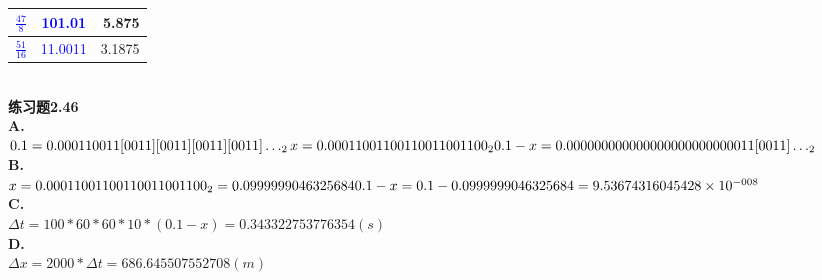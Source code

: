 \documentclass{article}
\newcommand{\blue}[1]{\textcolor{blue}{#1}}
\begin{document}
\begin{CJK}{UTF8}{uyhei}
\begin{table}[htbp]
\begin{tabular}{|l|c|r|}
		\hline
		\blue{$\frac{47}{8}$}		&	\blue{ 101.01 }	&	5.875	\\
		\hline
		\blue{$\frac{51}{16}$}		&	\blue{11.0011}	&	3.1875	\\
		\hline
	\end{tabular}
\end{table}	\\
\textbf{练习题2.46}	\\
\textbf{A.} 	\\
\begin{math}
	0.1=0.000110011[0011][0011][0011][0011]\dots_2	\\
	  x=0.000110011 0011  0011  0011  00_2	\\
	  0.1-x=0.000000000 00000 00000 0000  0011 [0011]\dots_2
\end{math}	\\
\textbf{B.} 	\\
\begin{math}	
	x=0.000110011 0011  0011  0011  00_2=0.0999999046325684	\\
	0.1-x=0.1-0.0999999046325684=9.53674316045428\times10^{ -008 }
\end{math}	\\
\textbf{C.}	\\
\begin{math}	
	\Delta t=100*60*60*10*(0.1-x)=0.343322753776354(s)
\end{math}	\\
\textbf{D.}	\\
\begin{math}	
	\Delta x=2000*\Delta t=686.645507552708(m)
\end{math}	\\[3ex]
\newpage	

\renewcommand\arraystretch{1.5}


\end{CJK}
\end{document}
